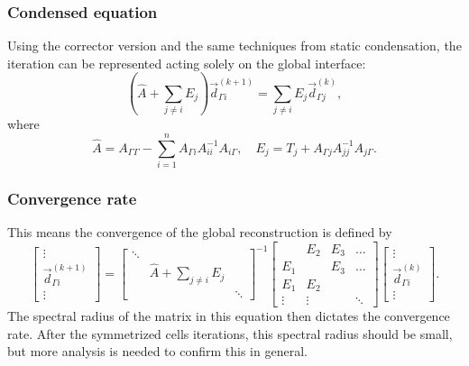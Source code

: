 \documentclass{beamer}
\begin{document}
\begin{frame}
\frametitle{Condensed equation}

Using the corrector version and the same techniques from static condensation, the iteration can be represented acting solely on the global interface:
\begin{equation*}
	\left ( \hat{A} + \sum_{j \neq i} E_j \right ) \vec{d}_{\Gamma i}^{(k+1)} = \sum_{j \neq i} E_j \vec{d}_{\Gamma j}^{(k)},
\end{equation*}
where
\begin{equation*}
	\hat{A} = A_{\Gamma \Gamma} - \sum_{i=1}^n A_{\Gamma i} A_{ii}^{-1} A_{i \Gamma}, \quad E_j = T_j + A_{\Gamma j} A_{jj}^{-1} A_{j \Gamma}.
\end{equation*}

\end{frame}

\begin{frame}
\frametitle{Convergence rate}

This means the convergence of the global reconstruction is defined by
\begin{equation*}
	\begin{bmatrix} \vdots \\ \vec{d}_{\Gamma i}^{(k+1)} \\ \vdots \end{bmatrix}
	=
	\begin{bmatrix} \ddots \\ & \hat{A} + \sum_{j \neq i} E_j \\ & & \ddots \end{bmatrix}^{-1}
	\begin{bmatrix} & E_2 & E_3 & \dots \\ E_1 & & E_3 & \dots \\ E_1 & E_2 \\ \vdots & \vdots & & \ddots \end{bmatrix}
	\begin{bmatrix} \vdots \\ \vec{d}_{\Gamma i}^{(k)} \\ \vdots \end{bmatrix}.
\end{equation*}
The spectral radius of the matrix in this equation then dictates the convergence rate.
After the symmetrized cells iterations, this spectral radius should be small, but more analysis is needed to confirm this in general.

\end{frame}

\end{document}
